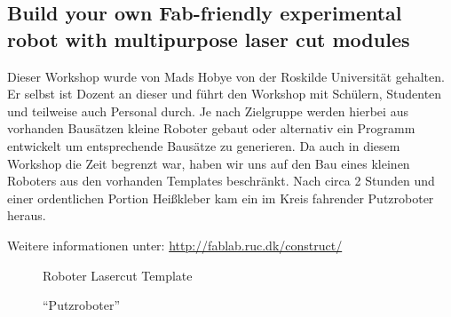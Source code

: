 \documentclass{\basedir/fablab-document}
\begin{document}
\subsection*{Build your own Fab-friendly experimental robot with multipurpose laser cut modules}

Dieser Workshop wurde von Mads Hobye von der Roskilde Universität
gehalten. Er selbst ist Dozent an dieser und führt den Workshop mit
Schülern, Studenten und teilweise auch Personal durch. Je nach
Zielgruppe werden hierbei aus vorhanden Bausätzen kleine Roboter gebaut
oder alternativ ein Programm entwickelt um entsprechende Bausätze zu
generieren. Da auch in diesem Workshop die Zeit begrenzt war, haben wir
uns auf den Bau eines kleinen Roboters aus den vorhanden Templates
beschränkt. Nach circa 2 Stunden und einer ordentlichen Portion
Heißkleber kam ein im Kreis fahrender Putzroboter heraus.

Weitere informationen unter: \url{http://fablab.ruc.dk/construct/}

\begin{figure}[h]
	\noindent{}
	\caption{Roboter Lasercut Template}
	\label{roboterbausatz}
\end{figure}
\begin{figure}[h]
	\noindent{}
	\caption{\enquote{Putzroboter}}
	\label{putzroboter}
\end{figure}
\end{document}
